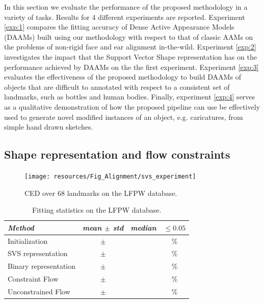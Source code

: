 In this section we evaluate the performance of the proposed methodology in a variety of tasks. Results for 4 different experiments are reported. Experiment \ref{exp:1} compares the fitting accuracy of Dense Active Appearance Models (DAAMs) built using our methodology with respect to that of classic AAMs on the problems of non-rigid face and ear alignment in-the-wild. Experiment \ref{exp:2} investigates the impact that the Support Vector Shape representation has on the performance achieved by DAAMs on the the first experiment. Experiment \ref{exp:3} evaluates the effectiveness of the proposed methodology to build DAAMs of objects that are difficult to annotated with respect to a consistent set of landmarks, such as bottles and human bodies. Finally, experiment \ref{exp:4} serves as a qualitative demonstration of how the proposed pipeline can use be effectively used to generate novel modified instances of an object, e.g. caricatures, from simple hand drawn sketches.

\subsection{Shape representation and flow constraints}

\begin{figure}[t!]
\centering
\texttt{[image: resources/Fig\_Alignment/svs\_experiment]}
\caption{CED over 68 landmarks on the LFPW database.}
\label{fig:face_ced}
\end{figure}

\begin{table}[t]
\small
\centering
\begin{tabular}{|l|c|c|c|}
\hline
\emph{Method}         & \emph{mean $\pm$ std} & \emph{median} & $\leq 0.05$\\
\hline
Initialization        & $\pm$ & & \%\\
\hline
SVS representation    & $\pm$ & & \%\\
Binary representation & $\pm$ & & \%\\
\hline
Constraint Flow       & $\pm$ & & \%\\
Unconstrained Flow    & $\pm$ & & \%\\
\hline
\end{tabular}
\caption{Fitting statistics on the LFPW database.}
\label{tab:face_statistics}
\end{table}

